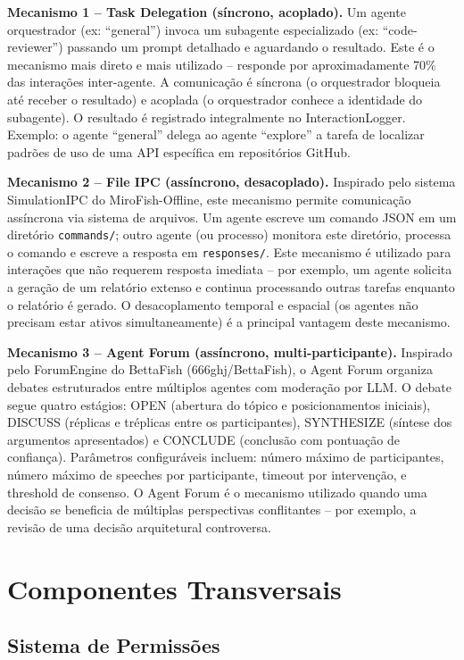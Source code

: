 \documentclass[12pt,a4paper,sumario=tradicional,openany]{abntex2}
\begin{document}
\textbf{Mecanismo 1 -- Task Delegation (síncrono, acoplado).} Um agente orquestrador (ex: ``general'') invoca um subagente especializado (ex: ``code-reviewer'') passando um prompt detalhado e aguardando o resultado. Este é o mecanismo mais direto e mais utilizado -- responde por aproximadamente 70\% das interações inter-agente. A comunicação é síncrona (o orquestrador bloqueia até receber o resultado) e acoplada (o orquestrador conhece a identidade do subagente). O resultado é registrado integralmente no InteractionLogger. Exemplo: o agente ``general'' delega ao agente ``explore'' a tarefa de localizar padrões de uso de uma API específica em repositórios GitHub.

\textbf{Mecanismo 2 -- File IPC (assíncrono, desacoplado).} Inspirado pelo sistema SimulationIPC do MiroFish-Offline, este mecanismo permite comunicação assíncrona via sistema de arquivos. Um agente escreve um comando JSON em um diretório \texttt{commands/}; outro agente (ou processo) monitora este diretório, processa o comando e escreve a resposta em \texttt{responses/}. Este mecanismo é utilizado para interações que não requerem resposta imediata -- por exemplo, um agente solicita a geração de um relatório extenso e continua processando outras tarefas enquanto o relatório é gerado. O desacoplamento temporal e espacial (os agentes não precisam estar ativos simultaneamente) é a principal vantagem deste mecanismo.

\textbf{Mecanismo 3 -- Agent Forum (assíncrono, multi-participante).} Inspirado pelo ForumEngine do BettaFish (666ghj/BettaFish), o Agent Forum organiza debates estruturados entre múltiplos agentes com moderação por LLM. O debate segue quatro estágios: OPEN (abertura do tópico e posicionamentos iniciais), DISCUSS (réplicas e tréplicas entre os participantes), SYNTHESIZE (síntese dos argumentos apresentados) e CONCLUDE (conclusão com pontuação de confiança). Parâmetros configuráveis incluem: número máximo de participantes, número máximo de speeches por participante, timeout por intervenção, e threshold de consenso. O Agent Forum é o mecanismo utilizado quando uma decisão se beneficia de múltiplas perspectivas conflitantes -- por exemplo, a revisão de uma decisão arquitetural controversa.

\section{Componentes Transversais}

\subsection{Sistema de Permissões}
\end{document}
